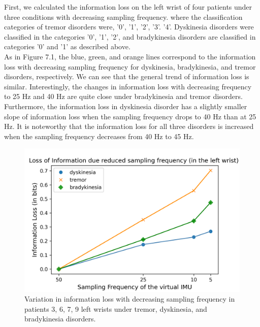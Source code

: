 First, we calculated the information loss on the left wrist of four patients under three conditions with decreasing sampling frequency. where the classification categories of tremor disorders were, '0', '1', '2', '3'. '4'. Dyskinesia disorders were classified in the categories '0', '1', '2', and bradykinesia disorders are classified in categories '0' and '1' as described above.\\
As in Figure 7.1, the blue, green, and orange lines correspond to the information loss with decreasing sampling frequency for dyskinesia, bradykinesia, and tremor disorders, respectively. We can see that the general trend of information loss is similar. Interestingly, the changes in information loss with decreasing frequency to 25 Hz and 40 Hz are quite close under bradykinesia and tremor disorders. Furthermore, the information loss in dyskinesia disorder has a slightly smaller slope of information loss when the sampling frequency drops to 40 Hz than at 25 Hz. It is noteworthy that the information loss for all three disorders is increased when the sampling frequency decreases from 40 Hz to 45 Hz.\\
\begin{figure}[htbp]
\centering
\includegraphics[width=13cm ]{report/pics/7.1.png}
\caption{Variation in information loss with decreasing sampling frequency in patients 3, 6, 7, 9 left wrists under tremor, dyskinesia, and bradykinesia disorders.}
\end{figure} \\

